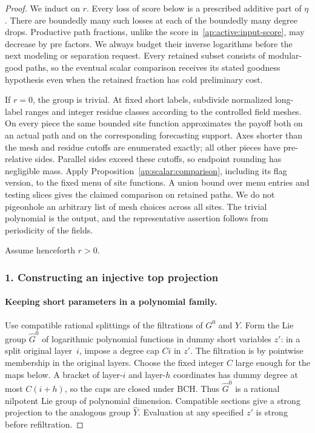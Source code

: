 \begin{proof}
We induct on $r$.  Every loss of score below is a prescribed additive
part of $\eta$.  There are boundedly many such losses at each of the
boundedly many degree drops.  Productive path fractions, unlike the
score in~\eqref{ap:active:input-score}, may decrease by pre factors.
We always budget their inverse logarithms before the next modeling
or separation request.  Every retained subset consists of modular-good
paths, so the eventual scalar comparison receives its stated goodness
hypothesis even when the retained fraction has cold preliminary cost.

If $r=0$, the group is trivial.  At fixed short labels, subdivide
normalized long-label ranges and integer residue classes according
to the controlled field meshes.  On every piece the same bounded
site function approximates the payoff both on an actual path and
on the corresponding forecasting support.  Axes shorter than the
mesh and residue cutoffs are enumerated exactly; all other pieces
have pre-relative sides.  Parallel sides exceed these cutoffs, so
endpoint rounding has negligible mass.  Apply
Proposition~\ref{ap:scalar:comparison}, including its flag version,
to the fixed menu of site functions.  A union bound over menu
entries and testing slices gives the claimed comparison on retained
paths.  We do not pigeonhole an arbitrary list of mesh choices
across all sites.  The trivial polynomial is the output, and the
representative assertion follows from periodicity of the fields.

Assume henceforth $r>0$.

\subsubsection*{1. Constructing an injective top projection}

\paragraph{Keeping short parameters in a polynomial family.}

Use compatible rational splittings of the filtrations of $G^0$ and
$Y$.  Form the Lie group $\widehat G^0$ of logarithmic polynomial
functions in dummy short variables $z'$: in a split original
layer~$i$, impose a degree cap $Ci$ in $z'$.  The filtration is by
pointwise membership in the original layers.  Choose the fixed
integer $C$ large enough for the maps below.  A bracket of layer-$i$
and layer-$h$ coordinates has dummy degree at most $C(i+h)$, so
the caps are closed under BCH.  Thus $\widehat G^0$ is a rational
nilpotent Lie group of polynomial dimension.  Compatible sections
give a strong projection to the analogous group $\widehat Y$.
Evaluation at any specified $z'$ is strong before refiltration.


\end{proof}
